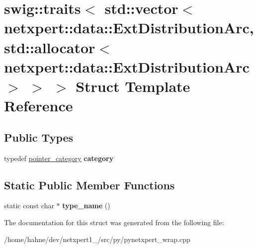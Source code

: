 \hypertarget{structswig_1_1traits_3_01std_1_1vector_3_01netxpert_1_1data_1_1ExtDistributionArc_00_01std_1_1al0b4376e77a49bd89f509b97ca309f02b}{}\section{swig\+:\+:traits$<$ std\+:\+:vector$<$ netxpert\+:\+:data\+:\+:Ext\+Distribution\+Arc, std\+:\+:allocator$<$ netxpert\+:\+:data\+:\+:Ext\+Distribution\+Arc $>$ $>$ $>$ Struct Template Reference}
\label{structswig_1_1traits_3_01std_1_1vector_3_01netxpert_1_1data_1_1ExtDistributionArc_00_01std_1_1al0b4376e77a49bd89f509b97ca309f02b}
\subsection*{Public Types}
\begin{DoxyCompactItemize}
\item 
typedef \hyperlink{structswig_1_1pointer__category}{pointer\+\_\+category} {\bfseries category}\hypertarget{structswig_1_1traits_3_01std_1_1vector_3_01netxpert_1_1data_1_1ExtDistributionArc_00_01std_1_1al0b4376e77a49bd89f509b97ca309f02b_a4bca6eb4897c6e963ee44168400b18be}{}\label{structswig_1_1traits_3_01std_1_1vector_3_01netxpert_1_1data_1_1ExtDistributionArc_00_01std_1_1al0b4376e77a49bd89f509b97ca309f02b_a4bca6eb4897c6e963ee44168400b18be}

\end{DoxyCompactItemize}
\subsection*{Static Public Member Functions}
\begin{DoxyCompactItemize}
\item 
static const char $\ast$ {\bfseries type\+\_\+name} ()\hypertarget{structswig_1_1traits_3_01std_1_1vector_3_01netxpert_1_1data_1_1ExtDistributionArc_00_01std_1_1al0b4376e77a49bd89f509b97ca309f02b_aa4393cfa93865d2ad2d401c7ec896e0a}{}\label{structswig_1_1traits_3_01std_1_1vector_3_01netxpert_1_1data_1_1ExtDistributionArc_00_01std_1_1al0b4376e77a49bd89f509b97ca309f02b_aa4393cfa93865d2ad2d401c7ec896e0a}

\end{DoxyCompactItemize}


The documentation for this struct was generated from the following file\+:\begin{DoxyCompactItemize}
\item 
/home/hahne/dev/netxpert1\+\_/src/py/pynetxpert\+\_\+wrap.\+cpp\end{DoxyCompactItemize}
